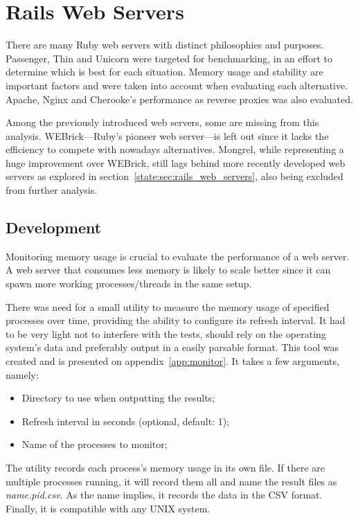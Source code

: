 \section{Rails Web Servers} %
\label{solution:sec:rails_web_servers}

There are many Ruby web servers with distinct philosophies and purposes. Passenger, Thin and Unicorn were targeted for benchmarking, in an effort to determine which is best for each situation. Memory usage and stability are important factors and were taken into account when evaluating each alternative. Apache, Nginx and Cherooke's performance as reverse proxies was also evaluated.

Among the previously introduced web servers, some are missing from this analysis. WEBrick---Ruby's pioneer web server---is left out since it lacks the efficiency to compete with nowadays alternatives. Mongrel, while representing a huge improvement over WEBrick, still lags behind more recently developed web servers as explored in section~\ref{state:sec:rails_web_servers}, also being excluded from further analysis.

\subsection{Development}
Monitoring memory usage is crucial to evaluate the performance of a web server. A web server that consumes less memory is likely to scale better since it can spawn more working processes/threads in the same setup.

There was need for a small utility to measure the memory usage of specified processes over time, providing the ability to configure its refresh interval. It had to be very light not to interfere with the tests, should rely on the operating system's data and preferably output in a easily parsable format. This tool was created and is presented on appendix~\ref{app:monitor}. It takes a few arguments, namely:
\begin{itemize}
  \item Directory to use when outputting the results;
  \item Refresh interval in seconds (optional, default: 1);
  \item Name of the processes to monitor;
\end{itemize}
The utility records each process's memory usage in its own file. If there are multiple processes running, it will record them all and name the result files as \textit{name.pid.csv}. As the name implies, it records the data in the CSV format. Finally, it is compatible with any UNIX system.

